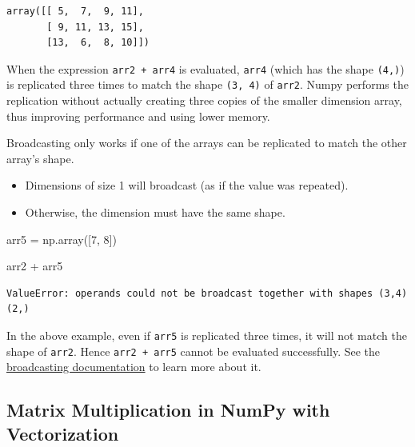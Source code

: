 \documentclass[
  letterpaper,
  DIV=11,
  numbers=noendperiod]{scrreprt}
\newenvironment{Shaded}{\begin{snugshade}}{\end{snugshade}}
\newcommand{\DecValTok}[1]{\textcolor[rgb]{0.68,0.00,0.00}{#1}}
\newcommand{\NormalTok}[1]{\textcolor[rgb]{0.00,0.23,0.31}{#1}}
\newcommand{\OperatorTok}[1]{\textcolor[rgb]{0.37,0.37,0.37}{#1}}
\providecommand{\tightlist}{%
  \setlength{\itemsep}{0pt}\setlength{\parskip}{0pt}}\usepackage{longtable,booktabs,array}
\begin{document}
\begin{verbatim}
array([[ 5,  7,  9, 11],
       [ 9, 11, 13, 15],
       [13,  6,  8, 10]])
\end{verbatim}

When the expression \texttt{arr2\ +\ arr4} is evaluated, \texttt{arr4}
(which has the shape \texttt{(4,)}) is replicated three times to match
the shape \texttt{(3,\ 4)} of \texttt{arr2}. Numpy performs the
replication without actually creating three copies of the smaller
dimension array, thus improving performance and using lower memory.

Broadcasting only works if one of the arrays can be replicated to match
the other array's shape.

\begin{itemize}
\tightlist
\item
  Dimensions of size 1 will broadcast (as if the value was repeated).
\item
  Otherwise, the dimension must have the same shape.
\end{itemize}

\begin{Shaded}
\begin{Highlighting}[]
\NormalTok{arr5 }\OperatorTok{=}\NormalTok{ np.array([}\DecValTok{7}\NormalTok{, }\DecValTok{8}\NormalTok{])}
\end{Highlighting}
\end{Shaded}

\begin{Shaded}
\begin{Highlighting}[]
\NormalTok{arr2 }\OperatorTok{+}\NormalTok{ arr5}
\end{Highlighting}
\end{Shaded}

\begin{verbatim}
ValueError: operands could not be broadcast together with shapes (3,4) (2,) 
\end{verbatim}

In the above example, even if \texttt{arr5} is replicated three times,
it will not match the shape of \texttt{arr2}. Hence
\texttt{arr2\ +\ arr5} cannot be evaluated successfully. See the
\href{https://numpy.org/doc/stable/user/basics.broadcasting.html}{broadcasting
documentation} to learn more about it.

\hypertarget{matrix-multiplication-in-numpy-with-vectorization}{%
\subsection{Matrix Multiplication in NumPy with
Vectorization}\label{matrix-multiplication-in-numpy-with-vectorization}}
\end{document}
